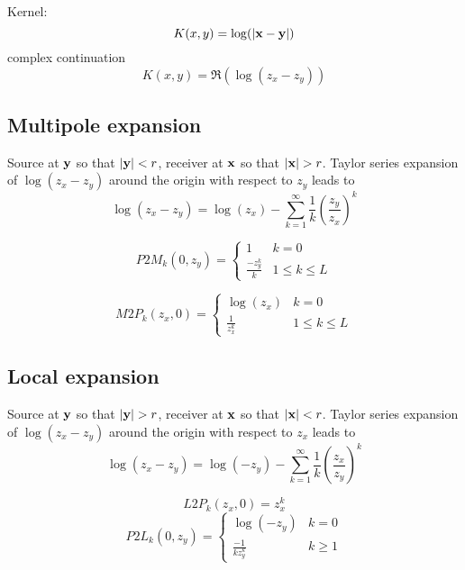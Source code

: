 \documentclass{article}
\begin{document}
Kernel:
%
\begin{equation}
	K(x,y) = \log(|{\bf x} - {\bf y}|)
\end{equation}
%
complex continuation
%
\begin{equation}
	K(x,y) = \Re\left( \log(z_x - z_y) \right)
\end{equation}
%

\subsection{Multipole expansion}

Source at ${\bf y}$ so that $|{\bf y}| < r$, receiver at ${\bf x}$ so that $|{\bf x}| > r$.
Taylor series expansion of $\log (z_x - z_y)$ around the origin with respect to $z_y$ leads to
%
\begin{equation}
	\log (z_x - z_y) = \log(z_x) - \sum_{k = 1}^{\infty} \frac{1}{k} \left(\frac{z_y}{z_x}\right)^k
\end{equation}

\begin{equation}
	P2M_k(0,z_y) = 
	\begin{cases}
		1 & k = 0 \\
		\frac{-z_y^k}{k} & 1 \le k \le L
	\end{cases}
\end{equation}

\begin{equation}
	M2P_k(z_x, 0) = 
	\begin{cases}
		\log(z_x) & k = 0 \\
		\frac{1}{z_x^k} & 1 \le k \le L 
	\end{cases}
\end{equation}

\subsection{Local expansion}

Source at ${\bf y}$ so that $|{\bf y}| > r$, receiver at ${\bf x}$ so that $|{\bf x}| < r$.
Taylor series expansion of $\log (z_x - z_y)$ around the origin with respect to $z_x$ leads to
%
\begin{equation}
	\log (z_x - z_y) = \log(-z_y) - \sum_{k = 1}^{\infty} \frac{1}{k} \left(\frac{z_x}{z_y}\right)^k
\end{equation}

\begin{equation}
	L2P_k(z_x, 0) = z_x^k
\end{equation}
%
\begin{equation}
	P2L_k(0, z_y) = \begin{cases}
		\log(-z_y) & k = 0 \\
		\frac{-1}{k z_y^k} &k \ge 1
	\end{cases}
\end{equation}
\end{document}
